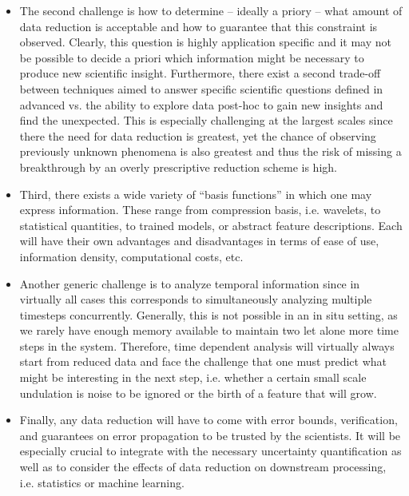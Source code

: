 \begin{refsection}
\begin{itemize}
\item
The second challenge is how to determine -- ideally a priory -- what amount of data reduction is acceptable and how to guarantee that this constraint is observed. Clearly, this question is highly application specific and it may not be possible to decide a priori which information might be necessary to produce new scientific insight. Furthermore, there exist a second trade-off between techniques aimed to answer specific scientific questions defined in advanced vs. the ability to explore data post-hoc to gain new insights and find the unexpected. This is especially challenging at the largest scales since there the need for data reduction is greatest, yet the chance of observing previously unknown phenomena is also greatest and thus the risk of missing a breakthrough by an overly prescriptive reduction scheme is high. 

\item
Third, there exists a wide variety of “basis functions” in which one may express information. These range from compression basis, i.e. wavelets, to statistical quantities, to trained models, or abstract feature descriptions. Each will have their own advantages and disadvantages in terms of ease of use, information density, computational costs, etc.

\item
Another generic challenge is to analyze temporal information since in virtually all cases this corresponds to simultaneously analyzing multiple timesteps concurrently. Generally, this is not possible in an in situ setting, as we rarely have enough memory available to maintain two let alone more time steps in the system. Therefore, time dependent analysis will virtually always start from reduced data and face the challenge that one must predict what might be interesting in the next step, i.e. whether a certain small scale undulation is noise to be ignored or the birth of a feature that will grow. 

\item
Finally, any data reduction will have to come with error bounds, verification, and guarantees on error propagation to be trusted by the scientists. It will be especially crucial to integrate with the necessary uncertainty quantification as well as to consider the effects of data reduction on downstream processing, i.e. statistics or machine learning.
\end{itemize}


\end{refsection}
